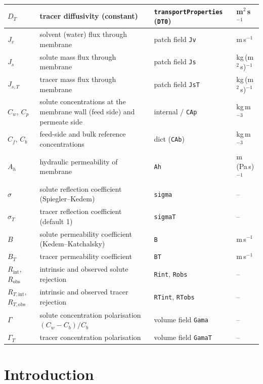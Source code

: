 \documentclass[11pt,a4paper]{article}
\begin{document}
\begin{tabular}{@{}lp{7cm}ll@{}}
		$D_T$ & tracer diffusivity (constant) & \texttt{transportProperties} (\texttt{DT0}) & m$^2$\,s$^{-1}$\\
		\midrule
		$J_v$ & solvent (water) flux through membrane & patch field \texttt{Jv} & m\,s$^{-1}$\\
		$J_s$ & solute mass flux through membrane & patch field \texttt{Js} & kg\,(m$^2$\,s)$^{-1}$\\
		$J_{s,T}$ & tracer mass flux through membrane & patch field \texttt{JsT} & kg\,(m$^2$\,s)$^{-1}$\\
		$C_w$, $C_p$ & solute concentrations at the membrane wall (feed side) and permeate side & internal $/$ \texttt{CAp} & kg\,m$^{-3}$\\
		$C_f$, $C_b$ & feed-side and bulk reference concentrations & dict (\texttt{CAb}) & kg\,m$^{-3}$\\
		\midrule
		$A_h$ & hydraulic permeability of membrane & \texttt{Ah} & m\,(Pa\,s)$^{-1}$\\
		$\sigma$ & solute reflection coefficient (Spiegler--Kedem) & \texttt{sigma} & --\\
		$\sigma_T$ & tracer reflection coefficient (default 1) & \texttt{sigmaT} & --\\
		$B$ & solute permeability coefficient (Kedem--Katchalsky) & \texttt{B} & m\,s$^{-1}$\\
		$B_T$ & tracer permeability coefficient & \texttt{BT} & m\,s$^{-1}$\\
		$R_\mathrm{int}$, $R_\mathrm{obs}$ & intrinsic and observed solute rejection & \texttt{Rint}, \texttt{Robs} & --\\
		$R_{T,\mathrm{int}}$, $R_{T,\mathrm{obs}}$ & intrinsic and observed tracer rejection & \texttt{RTint}, \texttt{RTobs} & --\\
		$\Gamma$ & solute concentration polarisation $(C_w - C_b)/C_b$ & volume field \texttt{Gama} & --\\
		$\Gamma_T$ & tracer concentration polarisation & volume field \texttt{GamaT} & --\\
		\bottomrule
	\end{tabular}
	\renewcommand{\arraystretch}{1.0}

	\clearpage


\section{Introduction}
\end{document}

